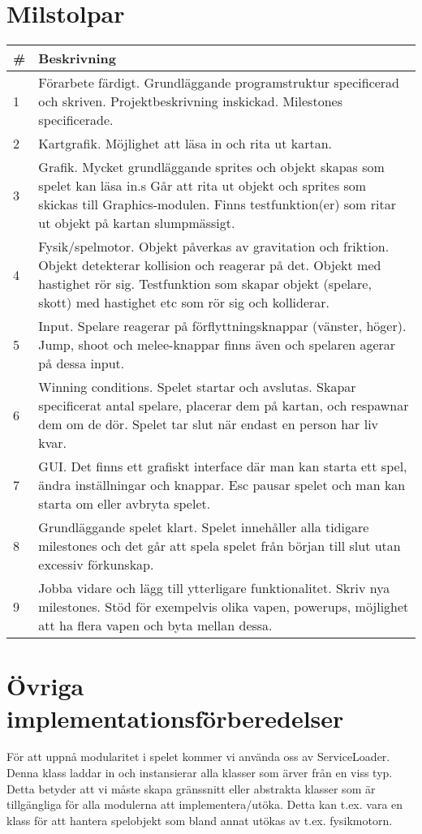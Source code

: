 \section{Milstolpar}
\begin{tabular}{| l | p{11cm} |}
    \hline
    \# & Beskrivning \\ \hline
    1 & Förarbete färdigt. Grundläggande programstruktur specificerad och skriven. Projektbeskrivning inskickad. Milestones specificerade. \\ \hline
    2 & Kartgrafik. Möjlighet att läsa in och rita ut kartan. \\ \hline
    3 & Grafik. Mycket grundläggande sprites och objekt skapas som spelet kan läsa in.s Går att rita ut objekt och sprites som skickas till Graphics-modulen. Finns testfunktion(er) som ritar ut objekt på kartan slumpmässigt. \\ \hline
    4 & Fysik/spelmotor. Objekt påverkas av gravitation och friktion. Objekt detekterar kollision och reagerar på det. Objekt med hastighet rör sig. Testfunktion som skapar objekt (spelare, skott) med hastighet etc som rör sig och kolliderar. \\ \hline
    5 & Input. Spelare reagerar på förflyttningsknappar (vänster, höger). Jump, shoot och melee-knappar finns även och spelaren agerar på dessa input. \\ \hline
    6 & Winning conditions. Spelet startar och avslutas. Skapar specificerat antal spelare, placerar dem på kartan, och respawnar dem om de dör. Spelet tar slut när endast en person har liv kvar. \\ \hline
    7 & GUI. Det finns ett grafiskt interface där man kan starta ett spel, ändra inställningar och knappar. Esc pausar spelet och man kan starta om eller avbryta spelet. \\ \hline
    8 & Grundläggande spelet klart. Spelet innehåller alla tidigare milestones och det går att spela spelet från början till slut utan excessiv förkunskap. \\ \hline
    9 & Jobba vidare och lägg till ytterligare funktionalitet. Skriv nya milestones. Stöd för exempelvis olika vapen, powerups, möjlighet att ha flera vapen och byta mellan dessa. \\ \hline
\end{tabular}
\section{Övriga implementationsförberedelser}
För att uppnå modularitet i spelet kommer vi använda oss av ServiceLoader. Denna klass laddar in och instansierar alla klasser som ärver från en viss typ. Detta betyder att vi måste skapa gränssnitt eller abstrakta klasser som är tillgängliga för alla modulerna att implementera/utöka. Detta kan t.ex. vara en klass för att hantera spelobjekt som bland annat utökas av t.ex. fysikmotorn.
